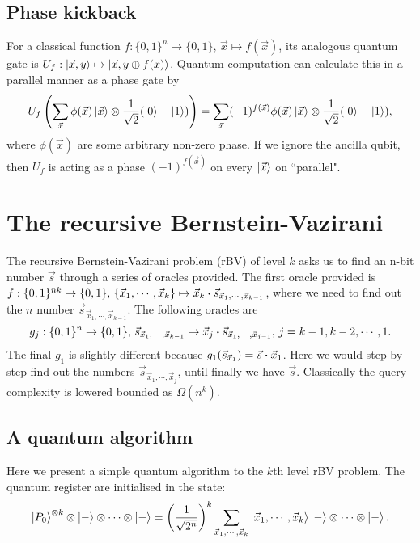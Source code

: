 \documentclass{article}
\begin{document}
\subsection{Phase kickback}
\label{sec:Phase kick}
For a classical function $f:\{0,1\}^n\to \{0,1\},\, \vec{x}\mapsto f(\vec{x})$,
its analogous quantum gate is $U_f:\ket{\vec{x},y} \mapsto \ket{\vec{x},y\oplus
f(x)}$. Quantum computation can calculate this in a parallel manner as a phase
gate by
\begin{equation}
  U_f \left(\sum_{\vec{x}} \phi(\vec{x})  \ket{\vec{x}}
  \otimes \frac{1}{\sqrt{2}} (\ket{0}-\ket{1}) \right)
  = \sum_{\vec{x}} (-1)^{f(\vec{x})} \phi(\vec{x})\ket{\vec{x}} 
  \otimes \frac{1}{\sqrt{2}} (\ket{0}-\ket{1}),
\end{equation}
where $\phi(\vec{x})$ are some arbitrary non-zero phase. If we ignore the
ancilla qubit, then $U_f$ is acting as a phase $(-1)^{f(\vec{x})}$ on every
$\ket{\vec{x}}$ on ``parallel".


\section{The recursive Bernstein-Vazirani}
\label{sec:The recursive Bernstein-Vazirani}

The recursive Bernstein-Vazirani problem (rBV) of level $k$ asks us to find an n-bit number
$\vec{s}$ through a series of oracles provided. The first oracle provided is
$f:\{0,1\}^{nk}\to \{0,1\},\, \{\vec{x}_1,\cdots, \vec{x}_k\}\mapsto
\vec{x}_k\vdot \vec{s}_{\vec{x}_1,\cdots,\vec{x}_{k-1}}$, where we need to find
out the $n$ number $\vec{s}_{\vec{x}_1,\cdots,\vec{x}_{k-1}}$. The following
oracles are 
\begin{equation}
  g_j: \{0,1\}^n\to \{0,1\},\, \vec{s}_{\vec{x}_1,\cdots,\vec{x}_{k-1}}
  \mapsto \vec{x}_j \vdot \vec{s}_{\vec{x}_1,\cdots,\vec{x}_{j-1}},\,
  j=k-1,k-2,\cdots,1.
\end{equation}
The final $g_1$ is slightly different because
$g_1(\vec{s}_{\vec{x}_1})=\vec{s}\vdot\vec{x}_1$. Here we would step by step
find out the numbers $\vec{s}_{\vec{x}_1,\cdots,\vec{x}_j}$, until finally we
have $\vec{s}$. Classically the query complexity is lowered bounded as
$\Omega(n^k)$.

\subsection{A quantum algorithm}
\label{sec:A quantum algorithm}

Here we present a simple quantum algorithm to the $k$th level rBV problem. The
quantum register are initialised in the state:
\begin{equation}
  \ket{P_0}^{\otimes k}\otimes \ket{-} \otimes \cdots \otimes \ket{-} 
  = \left(\frac{1}{\sqrt{2^n}}\right)^k
  \sum_{\vec{x}_1,\cdots,\vec{x}_{k}} \ket{\vec{x}_1,\cdots,\vec{x}_k}
  \ket{-} \otimes \cdots \otimes \ket{-}.
\end{equation}
\end{document}
